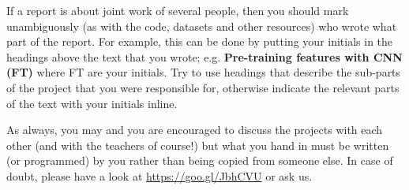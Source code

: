 \documentclass[a4paper,11pt]{article}
\begin{document}
If a report is about joint work of several people, then you should
mark unambiguously (as with the code, datasets and other resources)
who wrote what part of the report. For example, this can be done by
putting your initials in the headings above the text that you wrote;
e.g. \textbf{Pre-training features with CNN (FT)} where FT are your
initials. Try to use headings that describe the sub-parts of the
project that you were responsible for, otherwise indicate the relevant
parts of the text with your initials inline.

As always, you may and you are encouraged to discuss the projects with
each other (and with the teachers of course!) but what you hand in
must be written (or programmed) by you rather than being copied from
someone else. In case of doubt, please have a look at
\href{http://www.cl.cam.ac.uk/teaching/exams/plagiarism.html}{https://goo.gl/JbhCVU}
or ask us.


% 
% 
\end{document}
